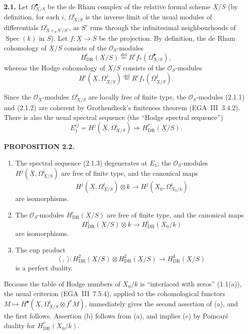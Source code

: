 \documentclass[10pt]{article}
\newcommand{\UX}{\underline{X}}
\begin{document}
\noindent\textbf{2.1.} Let $\Omega^\bullet_{\UX/S}$ be the de Rham complex of the relative formal scheme $\UX/S$ (by definition, for each $i$, $\Omega^i_{\UX/S}$ is the inverse limit of the usual modules of differentials $\Omega^i_{\UX\times_S S'/S'}$, as $S'$ runs through the infinitesimal neighbourhoods of $\operatorname{Spec}(k)$ in $S$). Let $f:\UX\to S$ be the projection. By definition, the de Rham cohomology of $\UX/S$ consists of the $\mathcal O_S$-modules
\begin{equation}\tag{2.1.1}
H^i_{\mathrm{DR}}(\UX/S)\overset{\mathrm{def}}{=}R^if_*(\Omega^\bullet_{\UX/S}),
\end{equation}
whereas the Hodge cohomology of $\UX/S$ consists of the $\mathcal O_S$-modules
\begin{equation}\tag{2.1.2}
H^i(\UX,\Omega^j_{\UX/S})\overset{\mathrm{def}}{=}R^if_*(\Omega^j_{\UX/S}).
\end{equation}
\newpage
\setcounter{footnote}{0}
\fontsize{10.2pt}{12.04pt}\selectfont

Since the $\mathcal O_{\UX}$-modules $\Omega^i_{\UX/S}$ are locally free of finite type, the $\mathcal O_S$-modules (2.1.1) and (2.1.2) are coherent by Grothendieck's finiteness theorem (EGA~III~3.4.2). There is also the usual spectral sequence (the ``Hodge spectral sequence'')
\begin{equation}\tag{2.1.3}
E_1^{ij}=H^j(\UX,\Omega^i_{\UX/S})\Longrightarrow H^*_{\mathrm{DR}}(\UX/S).
\end{equation}

\noindent\textbf{PROPOSITION 2.2.}
\begin{enumerate}[label=\alph*)]
\item The spectral sequence (2.1.3) degenerates at $E_1$; the $\mathcal O_S$-modules $H^j(\UX,\Omega^i_{\UX/S})$ are free of finite type, and the canonical maps
\[
H^j(\UX,\Omega^i_{\UX/S})\otimes k\longrightarrow H^j(X_0,\Omega^i_{X_0/k})
\]
are isomorphisms.
\item The $\mathcal O_S$-modules $H^i_{\mathrm{DR}}(\UX/S)$ are free of finite type, and the canonical maps
\[
H^i_{\mathrm{DR}}(\UX/S)\otimes k\longrightarrow H^i_{\mathrm{DR}}(X_0/k)
\]
are isomorphisms.
\item The cup product
\[
\langle\ ,\ \rangle:H^2_{\mathrm{DR}}(\UX/S)\otimes H^2_{\mathrm{DR}}(\UX/S)
\longrightarrow H^4_{\mathrm{DR}}(\UX/S)
\]
is a perfect duality.
\end{enumerate}

Because the table of Hodge numbers of $X_0/k$ is ``interlaced with zeros'' (1.1(a)), the usual criterion (EGA~III~7.5.4), applied to the cohomological functors
$M\mapsto H^\bullet(\UX,\Omega^i_{\UX/S}\otimes f^*M)$, immediately gives the second assertion of (a), and the first follows. Assertion (b) follows from (a), and implies (c) by Poincaré duality for $H^*_{\mathrm{DR}}(X_0/k)$.
\end{document}
